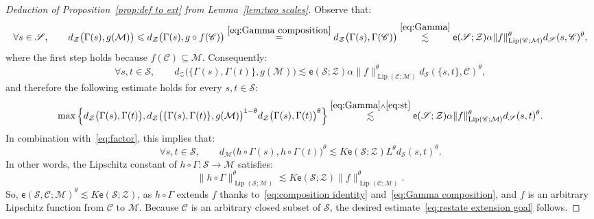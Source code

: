 \documentclass[11pt,reqno]{amsart}
\DeclareMathOperator{\Lip}{Lip}
\renewcommand{\le}{\leqslant}
\renewcommand{\subset}{\subseteq}
\newcommand{\ee}{\mathsf{e}}
\newcommand{\cZ}{\mathcal{Z}}
\newcommand{\MM}{\mathcal{M}}
\renewcommand{\SS}{\mathscr{S}}
\newcommand{\sub}{\mathscr{C}}
\begin{document}
\begin{proof}[Deduction of Proposition~\ref{prop:def to ext}  from Lemma~\ref{lem:two scales}]
 Observe that:
$$
\forall s\in \SS,\qquad d_\cZ\big(\Gamma(s),g(\MM)\big)\le  d_\cZ\big(\Gamma(s),g\circ f(\sub)\big)\stackrel{\eqref{eq:Gamma composition}}{=} d_\cZ\big(\Gamma(s),\Gamma(\sub)\big)\stackrel{\eqref{eq:Gamma}}{\lesssim} \ee(\SS;\cZ) \alpha \|f\|_{\Lip(\sub;\MM)}^\theta  d_\SS(s,\sub)^\theta, 
$$
where the first step holds because $f(\sub)\subset \MM$. Consequently:
\begin{equation}\label{eq:st}
\forall s,t\in \SS,\qquad d_\cZ\big(\{\Gamma(s),\Gamma(t)\},g(\MM)\big)\lesssim  \ee(\SS;\cZ) \alpha \|f\|_{\Lip(\sub;\MM)}^\theta   d_\SS(\{s,t\},\sub)^\theta,
\end{equation}
and therefore the following estimate holds for every $s,t\in \SS$:
$$
\max\Big\{d_\cZ\big(\Gamma(s),\Gamma(t)\big),d_\cZ\big(\{\Gamma(s),\Gamma(t)\},g(\MM)\big)^{1-\theta}d_\cZ\big(\Gamma(s),\Gamma(t)\big)^\theta\Big\}
\stackrel{\eqref{eq:Gamma}\wedge\eqref{eq:st}}{ \lesssim} \ee(\SS;\cZ)\alpha \|f\|_{\Lip(\sub;\MM)}^\theta  d_\SS(s,t)^\theta.
$$
In combination with~\eqref{eq:factor}, this implies that: 
$$
\forall s,t\in \SS,\qquad d_\MM\big(h\circ \Gamma(s),h\circ \Gamma(t)\big)^\theta\lesssim K\ee(\SS;\cZ) L^\theta d_\SS(s,t)^\theta.
$$
In other words, the Lipschitz constant of $h\circ \Gamma:\SS\to \MM$ satisfies: 
$$
\|h\circ  \Gamma\|_{\Lip(\SS;\MM)}^\theta\lesssim K\ee(\SS;\cZ)\|f\|_{\Lip(\sub;\MM)}^\theta.
$$
So, $\ee(\SS,\sub;\MM)^\theta\lesssim K\ee(\SS;\cZ)$, as   $h\circ \Gamma$ extends $f$ thanks to~\eqref{eq:composition identity} and~\eqref{eq:Gamma composition},  and $f$ is an arbitrary Lipschitz function from $\sub$ to $\MM$. Because $\sub$ is an arbitrary closed subset of $\SS$, the desired estimate~\eqref{eq:restate extension goal} follows.
\end{proof}
\end{document}
